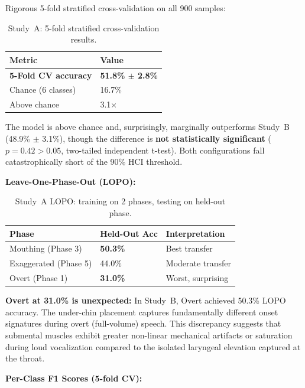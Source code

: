 \documentclass{article}
\begin{document}
Rigorous 5-fold stratified cross-validation on all 900 samples:

\begin{table}[ht]
\centering
\caption{Study~A: 5-fold stratified cross-validation results.}
\label{tab:testset}
\begin{tabular}{@{}ll@{}}
\toprule
Metric & Value \\
\midrule
\textbf{5-Fold CV accuracy} & \textbf{51.8\% $\pm$ 2.8\%} \\
Chance (6 classes) & 16.7\% \\
Above chance & 3.1$\times$ \\
\bottomrule
\end{tabular}
\end{table}

The model is above chance and, surprisingly, marginally outperforms Study~B (48.9\% $\pm$ 3.1\%), though the difference is \textbf{not statistically significant} ($p = 0.42 > 0.05$, two-tailed independent t-test). Both configurations fall catastrophically short of the 90\% HCI threshold.

\textbf{Leave-One-Phase-Out (LOPO):}

\begin{table}[ht]
\centering
\caption{Study~A LOPO: training on 2 phases, testing on held-out phase.}
\label{tab:lopo}
\begin{tabular}{@{}lll@{}}
\toprule
Phase & Held-Out Acc & Interpretation \\
\midrule
Mouthing (Phase 3) & \textbf{50.3\%} & Best transfer \\
Exaggerated (Phase 5) & 44.0\% & Moderate transfer \\
Overt (Phase 1) & \textbf{31.0\%} & Worst, surprising \\
\bottomrule
\end{tabular}
\end{table}

\textbf{Overt at 31.0\% is unexpected:} In Study~B, Overt achieved 50.3\% LOPO accuracy. The under-chin placement captures fundamentally different onset signatures during overt (full-volume) speech. This discrepancy suggests that submental muscles exhibit greater non-linear mechanical artifacts or saturation during loud vocalization compared to the isolated laryngeal elevation captured at the throat.

\textbf{Per-Class F1 Scores (5-fold CV):}
\end{document}
